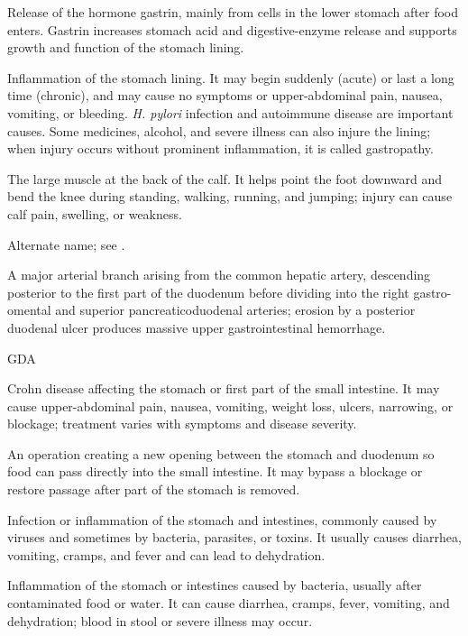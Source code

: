  Release of the hormone gastrin, mainly from cells in the lower stomach after food enters. Gastrin increases stomach acid and digestive-enzyme release and supports growth and function of the stomach lining.

 Inflammation of the stomach lining. It may begin suddenly (acute) or last a long time (chronic), and may cause no symptoms or upper-abdominal pain, nausea, vomiting, or bleeding. \textit{H. pylori} infection and autoimmune disease are important causes. Some medicines, alcohol, and severe illness can also injure the lining; when injury occurs without prominent inflammation, it is called gastropathy.

 The large muscle at the back of the calf. It helps point the foot downward and bend the knee during standing, walking, running, and jumping; injury can cause calf pain, swelling, or weakness.

 Alternate name; see .

 A major arterial branch arising from the common hepatic artery, descending posterior to the first part of the duodenum before dividing into the right gastro-omental and superior pancreaticoduodenal arteries; erosion by a posterior duodenal ulcer produces massive upper gastrointestinal hemorrhage.

\synonyms
GDA

 Crohn disease affecting the stomach or first part of the small intestine. It may cause upper-abdominal pain, nausea, vomiting, weight loss, ulcers, narrowing, or blockage; treatment varies with symptoms and disease severity.

 An operation creating a new opening between the stomach and duodenum so food can pass directly into the small intestine. It may bypass a blockage or restore passage after part of the stomach is removed.

 Infection or inflammation of the stomach and intestines, commonly caused by viruses and sometimes by bacteria, parasites, or toxins. It usually causes diarrhea, vomiting, cramps, and fever and can lead to dehydration.

 Inflammation of the stomach or intestines caused by bacteria, usually after contaminated food or water. It can cause diarrhea, cramps, fever, vomiting, and dehydration; blood in stool or severe illness may occur.

